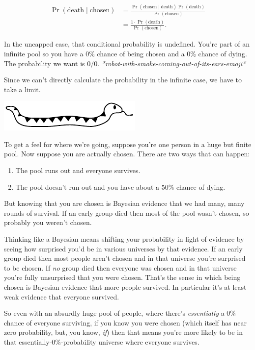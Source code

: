 \documentclass[article,twocolumn]{memoir}
\newcommand{\snakedivider}{
\vspace{.2em}
\begin{center}
\includegraphics[width=.25\linewidth]{snake}
\end{center}
\vspace{.1em}
}
\begin{document}
\begin{equation*}
\begin{split}
\Pr(\text{death} \mid \text{chosen}) & =
\frac{\Pr(\text{chosen} \mid \text{death}) \Pr(\text{death})}{\Pr(\text{chosen})} \\
& = \frac{1\cdot\Pr(\text{death})}{\Pr(\text{chosen})}.
\end{split}
\end{equation*}

In the uncapped case, that conditional probability is undefined. 
You're part of an infinite pool so you have a 0\% chance of being chosen and a 0\% chance of dying. 
The probability we want is 0/0. 
\emph{*robot-with-smoke-coming-out-of-its-ears-emoji*}

Since we can't directly calculate the probability in the infinite case, we have to take a limit.

\snakedivider

To get a feel for where we're going, suppose you're one person in a huge but finite pool.
Now suppose you are actually chosen. 
There are two ways that can happen: 
\begin{enumerate}
\item The pool runs out and everyone survives.
\item The pool doesn't run out and you have about a 50\% chance of dying. 
\end{enumerate}
But knowing that you are chosen is Bayesian evidence that we had many, many rounds of survival. 
If an early group died then most of the pool wasn't chosen, so probably you weren't chosen.

Thinking like a Bayesian means shifting your probability in light of evidence by seeing how surprised you'd be in various universes by that evidence.
If an early group died then most people aren't chosen and in that universe you're surprised to be chosen. 
If \emph{no} group died then everyone was chosen and in that universe you're fully unsurprised that you were chosen. 
That's the sense in which being chosen is Bayesian evidence that more people survived. 
In particular it's at least weak evidence that everyone survived.

So even with an absurdly huge pool of people, where there's \emph{essentially} a 0\% chance of everyone surviving, if you know you were chosen (which itself has near zero probability, but, you know, \emph{if}) then that means you're more likely to be in that essentially-0\%-probability universe where everyone survives.
\end{document}
